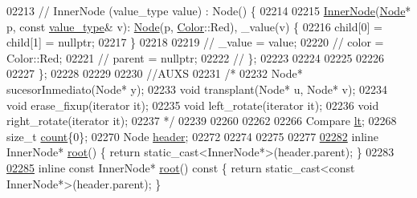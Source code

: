 \begin{DoxyCode}
02213     \textcolor{comment}{// InnerNode (value\_type value) : Node() \{}
02214     
02215     \hyperlink{structaed2_1_1map_1_1InnerNode}{InnerNode}(\hyperlink{structaed2_1_1map_1_1Node}{Node}* p, \textcolor{keyword}{const} \hyperlink{classaed2_1_1map_a719db98e0ff9a837610f76be33264680_a719db98e0ff9a837610f76be33264680}{value\_type}& v): \hyperlink{structaed2_1_1map_1_1Node}{Node}(p, 
      \hyperlink{classaed2_1_1map_a6d62a415a4b9d320b30cada4ebcf9f5b_a6d62a415a4b9d320b30cada4ebcf9f5b}{Color}::Red), \_value(v) \{
02216         child[0] = child[1] = \textcolor{keyword}{nullptr};
02217     \}
02218         
02219     \textcolor{comment}{//  \_value = value;}
02220     \textcolor{comment}{//  color = Color::Red;}
02221   \textcolor{comment}{//       parent = nullptr;}
02222   \textcolor{comment}{//       \};}
02223 
02224 
02225         
02226 
02227     \};
02228 
02229 
02230     \textcolor{comment}{//AUXS}
02231     \textcolor{comment}{/*}
02232 \textcolor{comment}{    Node* sucesorInmediato(Node* y);    }
02233 \textcolor{comment}{    void transplant(Node* u, Node* v);}
02234 \textcolor{comment}{    void erase\_fixup(iterator it);}
02235 \textcolor{comment}{    void left\_rotate(iterator it);}
02236 \textcolor{comment}{    void right\_rotate(iterator it);}
02237 \textcolor{comment}{    */}
02239 
02260 
02262 
02266     Compare \hyperlink{classaed2_1_1map_a0e5be36fae0693e4665bd2a615e7550a_a0e5be36fae0693e4665bd2a615e7550a}{lt};
02268     \textcolor{keywordtype}{size\_t} \hyperlink{classaed2_1_1map_a44236c4f16cdc20a10759862b198bde4_a44236c4f16cdc20a10759862b198bde4}{count}\{0\};
02270     Node \hyperlink{classaed2_1_1map_a92d93f905c8ad73fba18fdc7e8915cce_a92d93f905c8ad73fba18fdc7e8915cce}{header};
02272 
02274 
02275 
02277 
\hyperlink{classaed2_1_1map_a07ab50eda249a57858a34037d4c4c7b2_a07ab50eda249a57858a34037d4c4c7b2}{02282}     \textcolor{keyword}{inline} InnerNode* \hyperlink{classaed2_1_1map_a07ab50eda249a57858a34037d4c4c7b2_a07ab50eda249a57858a34037d4c4c7b2}{root}() \{ \textcolor{keywordflow}{return} \textcolor{keyword}{static\_cast<}InnerNode*\textcolor{keyword}{>}(header.parent); \}
02283 
\hyperlink{classaed2_1_1map_a66fe019d885578cc52949409f80858eb_a66fe019d885578cc52949409f80858eb}{02285}     \textcolor{keyword}{inline} \textcolor{keyword}{const} InnerNode* \hyperlink{classaed2_1_1map_a66fe019d885578cc52949409f80858eb_a66fe019d885578cc52949409f80858eb}{root}()\textcolor{keyword}{ const }\{ \textcolor{keywordflow}{return} \textcolor{keyword}{static\_cast<}\textcolor{keyword}{const }InnerNode*\textcolor{keyword}{>}(header.parent); \}

\end{DoxyCode}
